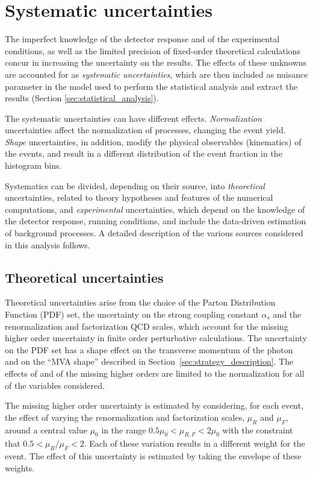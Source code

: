 \section{Systematic uncertainties}
\label{sec:systematics}
The imperfect knowledge of the detector response and of the experimental conditions, as well as the limited precision of fixed-order theoretical calculations concur in increasing the uncertainty on the results.
The effects of these unknowns are accounted for as \textit{systematic uncertainties}, which are then included as nuisance parameter in the model used to perform the statistical analysis and extract the results (Section \ref{sec:statistical_analysis}).

The systematic uncertainties can have different effects.
\textit{Normalization} uncertainties affect the normalization of processes, changing the event yield.
\textit{Shape} uncertainties, in addition, modify the physical observables (\eg kinematics) of the events, and result in a different distribution of the event fraction in the histogram bins.

Systematics can be divided, depending on their source, into \textit{theoretical} uncertainties, related to theory hypotheses and features of the numerical computations, and \textit{experimental} uncertainties, which depend on the knowledge of the detector response, running conditions, and include the data-driven estimation of background processes.
A detailed description of the various sources considered in this analysis follows.

\subsection{Theoretical uncertainties}
Theoretical uncertainties arise from the choice of the Parton Distribution Function (PDF) set,
the uncertainty on the strong coupling constant $\alpha_s$ and
the renormalization and factorization QCD scales, which account for the missing higher order uncertainty in finite order perturbative calculations.
The uncertainty on the PDF set has a shape effect on the transverse momentum of the photon
and on the ``MVA shape'' described in Section~\ref{sec:strategy_description}.
The effects of \alpS and of the missing higher orders are limited to the normalization for all of the variables considered.

The missing higher order uncertainty is estimated by considering, for each event, the effect
of varying the renormalization and factorization scales, $\mu_R$ and $\mu_F$,
around a central value $\mu_0$ in the range $0.5\mu_0 < \mu_{R,F} < 2\mu_0$
with the constraint that $0.5 < \mu_R/\mu_F < 2$.
Each of these variation results in a different weight for the event.
The effect of this uncertainty is estimated by taking the envelope of these weights.

